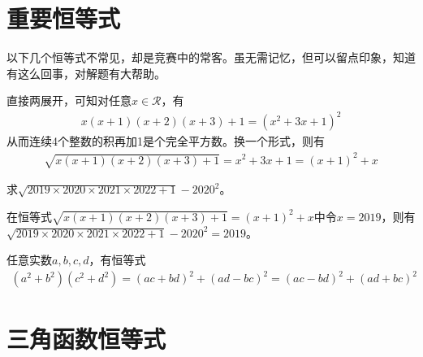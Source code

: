 \section{重要恒等式}
\label{sec:important-identities}

以下几个恒等式不常见，却是竞赛中的常客。虽无需记忆，但可以留点印象，知道有这么回事，对解题有大帮助。

\begin{example}\label{ex:product-of-four-continuous-integer}
  直接两展开，可知对任意$x\in\mathcal{R}$，有
  \begin{align*}
    x(x+1)(x+2)(x+3)+1=\left( x^2+3x+1\right )^2
  \end{align*}
  从而连续4个整数的积再加1是个完全平方数。换一个形式，则有
  \begin{align*}
    \sqrt{x(x+1)(x+2)(x+3)+1}= x^2+3x+1 = (x + 1)^2 + x
  \end{align*}
\end{example}

\begin{example}
  求$\sqrt{2019\times2020\times2021\times2022+1}-2020^2$。

  在恒等式$\sqrt{x(x+1)(x+2)(x+3)+1}= (x + 1)^2 + x$中令$x=2019$，则有
  $\sqrt{2019\times2020\times2021\times2022+1}-2020^2=2019$。
\end{example}

\begin{theorem}任意实数$a,b,c,d$，有恒等式
  \begin{align*}
    \left(a^2+b^2\right)\left(c^2+d^2\right)
    = \left(ac +  bd\right)^2 + \left(ad -  bc\right)^2
    = \left(ac -  bd\right)^2 + \left(ad +  bc\right)^2 
  \end{align*}
\end{theorem}

\section{三角函数恒等式}
\label{sec:trigonometric-identities}

